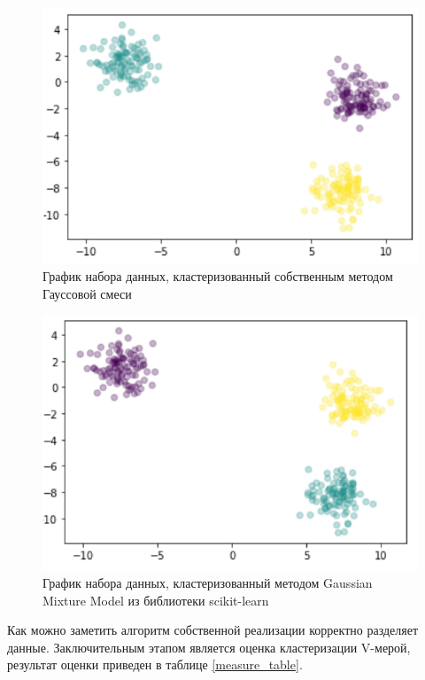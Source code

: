 \begin{figure}[H]
	\centering
	\includegraphics[width=\textwidth]{img/Clust_1.pdf}
	\caption{График набора данных, кластеризованный собственным методом Гауссовой смеси}
	\label{Clust_1}
\end{figure}  

\begin{figure}[H]
	\centering
	\includegraphics[width=\textwidth]{img/Clust_2.pdf}
	\caption{График набора данных, кластеризованный методом Gaussian Mixture Model из библиотеки scikit-learn}
	\label{Clust_2}
\end{figure}

Как можно заметить алгоритм собственной реализации корректно разделяет данные. Заключительным этапом является оценка кластеризации V-мерой, результат оценки приведен в таблице \ref{measure_table}.

